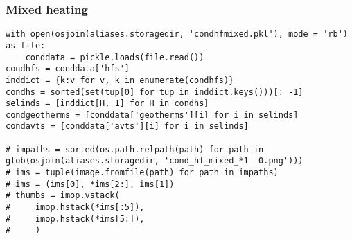 \subsubsection{Mixed heating}

\begin{verbatim}
with open(osjoin(aliases.storagedir, 'condhfmixed.pkl'), mode = 'rb') as file:
    conddata = pickle.loads(file.read())
condhfs = conddata['hfs']
inddict = {k:v for v, k in enumerate(condhfs)}
condhs = sorted(set(tup[0] for tup in inddict.keys()))[: -1]
selinds = [inddict[H, 1] for H in condhs]
condgeotherms = [conddata['geotherms'][i] for i in selinds]
condavts = [conddata['avts'][i] for i in selinds]

# impaths = sorted(os.path.relpath(path) for path in glob(osjoin(aliases.storagedir, 'cond_hf_mixed_*1 -0.png')))
# ims = tuple(image.fromfile(path) for path in impaths)
# ims = (ims[0], *ims[2:], ims[1])
# thumbs = imop.vstack(
#     imop.hstack(*ims[:5]),
#     imop.hstack(*ims[5:]),
#     )
\end{verbatim}

